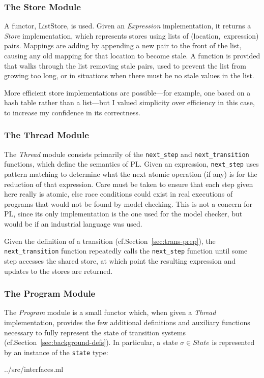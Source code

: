 \documentclass[12pt,a4paper,twoside,openany]{report}
\begin{document}
\subsubsection{The Store Module}
A functor, ListStore, is used. Given an
\emph{Expression} implementation, it
returns a \emph{Store} implementation, which
represents stores using lists of
(location,~expression) pairs. Mappings
are adding by appending a new pair to
the front of the list, causing any old
mapping for that location to become stale.
A function is provided that walks through
the list removing stale pairs, used to
prevent the list from growing too long,
or in situations when there must be
no stale values in the list.

More efficient store implementations are
possible---for example, one based on
a hash table rather than a list---but
I valued simplicity over efficiency
in this case,
to increase my confidence in its correctness.

\subsubsection{The Thread Module}
The \emph{Thread} module consists primarily of
the \texttt{next\_step} and \texttt{next\_transition}
functions, which define the semantics of PL.
Given an expression, \texttt{next\_step} uses pattern
matching to determine what the next atomic
operation (if any) is for the reduction
of that expression.
Care must be taken to
ensure that each step given here really is
atomic, else race conditions could exist
in real executions of programs that would
not be found by model checking. This
is not a concern for PL, since its only
implementation is the one used for the
model checker, but would be if
an industrial language was used.

Given the definition
of a transition (cf.\@ Section~\ref{sec:trans-prep}),
the \texttt{next\_transition}
function repeatedly calls the \texttt{next\_step}
function until some step accesses the shared
store, at which point the resulting expression
and updates to the stores are returned.

\subsubsection{The Program Module}
The \emph{Program} module is a small functor which,
when given a \emph{Thread} implementation, provides 
the few additional definitions and auxiliary
functions necessary to fully represent the state of
transition systems (cf.\@ Section~\ref{sec:background-defs}).
In particular, a state $\sigma \in \textit{State}$ is
represented by an instance of the \texttt{state} type:

	{../src/interfaces.ml}
\end{document}
